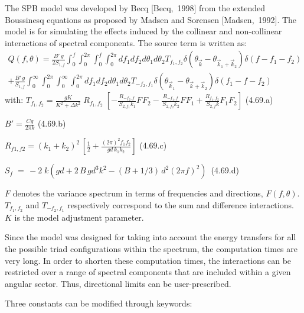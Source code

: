 The SPB model was developed by Becq [Becq,~1998] from the extended Boussinesq equations as proposed by Madsen and Sorensen [Madsen,~1992]. The model is for simulating the effects induced by the collinear and non-collinear interactions of spectral components. The source term is written as:
\begin{equation} \label{GrindEQ__4_68_}
\begin{array}{l} {Q\left(f,\theta \right)=\frac{B'\, g}{2S_{1,f} } \int _{0}^{f}\int _{0}^{2\pi }\int _{0}^{f}\int _{0}^{2\pi }df_{1} df_{2}     d\theta _{1} d\theta _{2} T_{f_{1} ,f_{2} } \delta \left(\theta _{\vec{k}} -\theta _{\vec{k}_{1} +\vec{k}_{2} } \right)\delta \left(f-f_{1} -f_{2} \right)} \\ {+\frac{B'\, g}{S_{1,f} } \int _{0}^{\infty }\int _{0}^{2\pi }\int _{0}^{\infty }\int _{0}^{2\pi }df_{1} df_{2}     d\theta _{1} d\theta _{2} T_{-f_{2} ,f_{1} } \delta \left(\theta _{\vec{k}_{1} } -\theta _{\vec{k}+\vec{k}_{2} } \right)\delta \left(f_{1} -f-f_{2} \right)} \end{array}
\end{equation}
with: $T_{f_{1} ,f_{2} } =\frac{gK}{K^{2} +\Delta k^{2} } \; R_{f_{1} ,f_{2} } \; \left[-\frac{R_{-f_{2} ,f} }{\, S_{2,f_{1} } k_{1} } F_{} F_{2} -\frac{R_{-f_{1} ,f} }{\, S_{2,f_{2} } k_{2} } F_{} F_{1} +\frac{R_{f_{1} ,f_{2} } }{\, S_{2,f} k} F_{1} F_{2} \right]$ (4.69.a)

 $B'=\frac{Cg}{2\pi k} $ (4.69.b)

 $R_{f1,f2} =\left(k_{1} +k_{2} \right)^{2} \, \left[\frac{1}{2} +\frac{\left(2\pi \right)^{2} f_{1} f_{2} }{gd\, k_{1} k_{2} } \right]$ (4.69.c)

 $S_{f} \; =\, -2\; k\left(gd+2\, B\, gd^{3} k_{}^{2} -(B+1/3)\, d^{2} \left(2\pi f\right)_{}^{2} \right)\, $ (4.69.d)

 $F$ denotes the variance spectrum in terms of frequencies and directions, $F\left(f,\theta \right)$. $T_{f_{1} ,f_{2} } $ and $T_{-f_{2} ,f_{1} } $ respectively correspond to the sum and difference interactions. $K$ is the model adjustment parameter.

 Since the model was designed for taking into account the energy transfers for all the possible triad configurations within the spectrum, the computation times are very long. In order to shorten these computation times, the interactions can be restricted over a range of spectral components that are included within a given angular sector. Thus, directional limits can be user-prescribed.

 Three constants can be modified through keywords:

